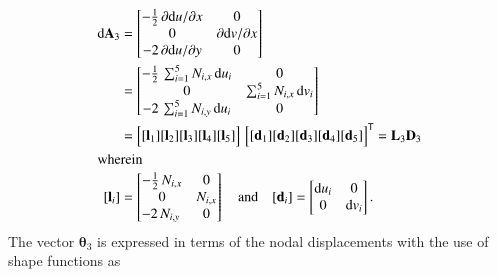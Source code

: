 \begin{subequations}
	\begin{align}
		\mathrm{d} \mathbf{A}_3 & =  \begin{bmatrix}
			-\tfrac{1}{2} \, \partial \mathrm{d} u / \partial x &  0 \\
			0 & \partial \mathrm{d} v / \partial x \\
			-2 \, \partial \mathrm{d} u / \partial y  & 0 \end{bmatrix} \notag \\
		& = \begin{bmatrix}
			-\tfrac{1}{2} \, \sum\nolimits_{i=1}^5 N_{i,x} \, \mathrm{d} u_i &  0 \\
			0 &  \sum\nolimits_{i=1}^5 N_{i,x} \, \mathrm{d} v_i \\
			-2 \, \sum\nolimits_{i=1}^5 N_{i,y} \, \mathrm{d} u_i  & 0 \end{bmatrix}\notag \\
		& = \begin{bmatrix}
			[\mathbf{l}_1] [\mathbf{l}_2] [\mathbf{l}_3] [\mathbf{l}_4] [\mathbf{l}_5] 
		\end{bmatrix} \, \begin{bmatrix} [\mathbf{d}_1] [\mathbf{d}_2] [\mathbf{d}_3] [\mathbf{d}_4] [\mathbf{d}_5] \end{bmatrix}^{\mathsf{T}}
		= \mathbf{L}_3 \mathbf{D}_3 \\
		\intertext{wherein}
		[\mathbf{l}_i] & = \begin{bmatrix}
			-\tfrac{1}{2} \, N_{i,x} &  0 \\
		0 &  N_{i,x} \\
			-2 \, N_{i,y} \, & 0 \end{bmatrix}  \quad \text{and} \quad	[\mathbf{d}_i] = \begin{bmatrix}
			\mathrm{d} u_i & 0 \\
			0 &  \mathrm{d} v_i  \end{bmatrix} .
	\end{align}
\end{subequations}
The vector $\boldsymbol{\theta}_3$ is expressed in terms of the nodal displacements with the use of shape functions as
\small
